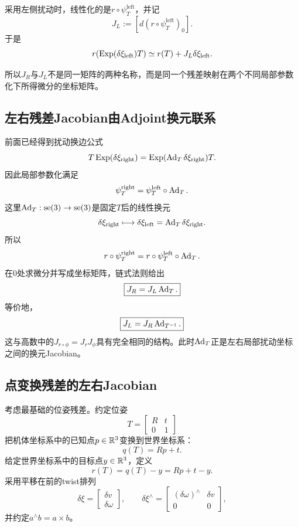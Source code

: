 采用左侧扰动时，线性化的是$r\circ\psi_T^{\mathrm{left}}$，并记
\[
    \boxed{
    J_L:=\left[d(r\circ\psi_T^{\mathrm{left}})_0\right].
    }
\]
于是
\[
    r(\operatorname{Exp}(\delta\xi_{\mathrm{left}})T)
    \simeq
    r(T)+J_L\delta\xi_{\mathrm{left}}.
\]

所以$J_R$与$J_L$不是同一矩阵的两种名称，而是同一个残差映射在两个不同局部参数化下所得微分的坐标矩阵。

\subsection{左右残差Jacobian由Adjoint换元联系}

前面已经得到扰动换边公式
\[
    T\operatorname{Exp}(\delta\xi_{\mathrm{right}})
    =\operatorname{Exp}(\operatorname{Ad}_T\delta\xi_{\mathrm{right}})T.
\]
因此局部参数化满足
\[
    \psi_T^{\mathrm{right}}
    =\psi_T^{\mathrm{left}}\circ\operatorname{Ad}_T.
\]
这里$\operatorname{Ad}_T:\operatorname{se}(3)\to\operatorname{se}(3)$是固定$T$后的线性换元
\[
    \delta\xi_{\mathrm{right}}
    \longmapsto
    \delta\xi_{\mathrm{left}}
    =\operatorname{Ad}_T\delta\xi_{\mathrm{right}}.
\]
所以
\[
    r\circ\psi_T^{\mathrm{right}}
    =r\circ\psi_T^{\mathrm{left}}\circ\operatorname{Ad}_T.
\]
在$0$处求微分并写成坐标矩阵，链式法则给出
\[
    \boxed{
    J_R=J_L\operatorname{Ad}_T.
    }
\]
等价地，
\[
    \boxed{
    J_L=J_R\operatorname{Ad}_{T^{-1}}.
    }
\]
这与高数中的$J_{r\circ\phi}=J_rJ_\phi$具有完全相同的结构。此时$\operatorname{Ad}_T$正是左右局部扰动坐标之间的换元Jacobian。

\subsection{点变换残差的左右Jacobian}

考虑最基础的位姿残差。约定位姿
\[
    T=
    \begin{bmatrix}R&t\\0&1\end{bmatrix}
\]
把机体坐标系中的已知点$p\in\mathbb{R}^3$变换到世界坐标系：
\[
    q(T)=Rp+t.
\]
给定世界坐标系中的目标点$y\in\mathbb{R}^3$，定义
\[
    r(T)=q(T)-y=Rp+t-y.
\]
采用平移在前的twist排列
\[
    \delta\xi=
    \begin{bmatrix}\delta v\\\delta\omega\end{bmatrix},
    \qquad
    \delta\xi^\wedge=
    \begin{bmatrix}
        (\delta\omega)^\wedge&\delta v\\
        0&0
    \end{bmatrix},
\]
并约定$a^\wedge b=a\times b$。

